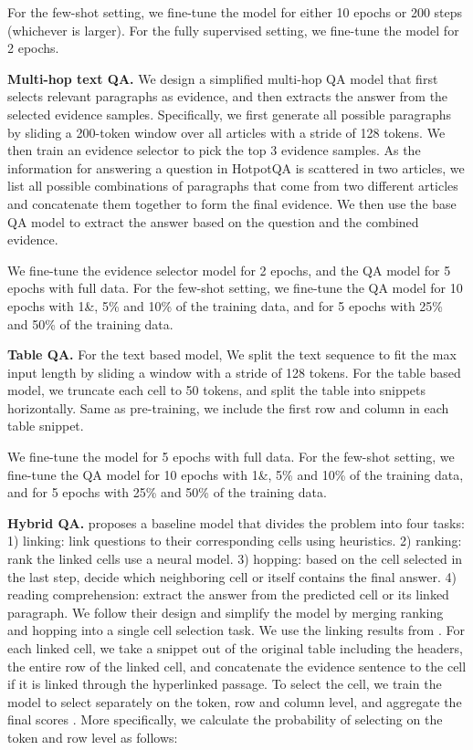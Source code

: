 \documentclass[11pt]{article}
\begin{document}
For the few-shot setting, we fine-tune the model for either 10 epochs or 200 steps (whichever is larger). For the fully supervised setting, we fine-tune the model for 2 epochs.

\noindent\textbf{Multi-hop text QA.}
We design a simplified multi-hop QA model that first selects relevant paragraphs as evidence, and then extracts the answer from the selected evidence samples. Specifically, we first generate all possible paragraphs by sliding a 200-token window over all articles with a stride of 128 tokens. We then train an evidence selector to pick the top 3 evidence samples. As the information for answering a question in HotpotQA is scattered in two articles, we list all possible combinations of paragraphs that come from two different articles and concatenate them together to form the final evidence. We then use the base QA model to extract the answer based on the question and the combined evidence.

We fine-tune the evidence selector model for 2 epochs, and the QA model for 5 epochs with full data. For the few-shot setting, we fine-tune the QA model for 10 epochs with 1\&, 5\% and 10\% of the training data, and for 5 epochs with 25\% and 50\% of the training data.

\noindent\textbf{Table QA.}
For the text based model, We split the text sequence to fit the max input length by sliding a window with a stride of 128 tokens. For the table based model, we truncate each cell to 50 tokens, and split the table into snippets horizontally. Same as pre-training, we include the first row and column in each table snippet.

We fine-tune the model for 5 epochs with full data. For the few-shot setting, we fine-tune the QA model for 10 epochs with 1\&, 5\% and 10\% of the training data, and for 5 epochs with 25\% and 50\% of the training data.

\noindent\textbf{Hybrid QA.}
\citet{chen-etal-2020-hybridqa} proposes a baseline model that divides the problem into four tasks: 1) linking: link questions to their corresponding cells using heuristics. 2) ranking: rank the linked cells use a neural model. 3) hopping: based on the cell selected in the last step, decide which neighboring cell or itself contains the final answer. 4) reading comprehension: extract the answer from the predicted cell or its linked paragraph. We follow their design and simplify the model by merging ranking and hopping into a single cell selection task. We use the linking results from \citet{chen-etal-2020-hybridqa}. For each linked cell, we take a snippet out of the original table including the headers, the entire row of the linked cell, and concatenate the evidence sentence to the cell if it is linked through the hyperlinked passage. To select the cell, we train the model to select separately on the token, row and column level, and aggregate the final scores . More specifically, we calculate the probability of selecting on the token and row level as follows:
\end{document}
